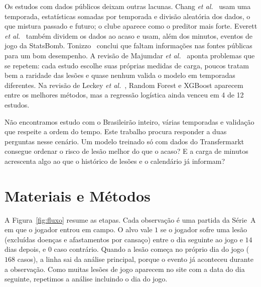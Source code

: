 \documentclass[conference]{IEEEtran}
\begin{document}
Os estudos com dados públicos deixam outras lacunas. Chang \textit{et al.}~\cite{chang2024} usam uma temporada, estatísticas somadas por temporada e divisão aleatória dos dados, o que mistura passado e futuro; o clube aparece como o preditor mais forte. Everett \textit{et al.}~\cite{everett2024} também dividem os dados ao acaso e usam, além dos minutos, eventos de jogo da StatsBomb. Tonizzo~\cite{tonizzo2025} conclui que faltam informações nas fontes públicas para um bom desempenho. A revisão de Majumdar \textit{et al.}~\cite{majumdar2022} aponta problemas que se repetem: cada estudo escolhe suas próprias medidas de carga, poucos tratam bem a raridade das lesões e quase nenhum valida o modelo em temporadas diferentes. Na revisão de Leckey \textit{et al.}~\cite{leckey2025}, Random Forest e XGBoost aparecem entre os melhores métodos, mas a regressão logística ainda venceu em 4 de 12 estudos.

Não encontramos estudo com o Brasileirão inteiro, várias temporadas e validação que respeite a ordem do tempo. Este trabalho procura responder a duas perguntas nesse cenário. Um modelo treinado só com dados do Transfermarkt consegue ordenar o risco de lesão melhor do que o acaso? E a carga de minutos acrescenta algo ao que o histórico de lesões e o calendário já informam?

\section{Materiais e Métodos}

A Figura~\ref{fig:fluxo} resume as etapas. Cada observação é uma partida da Série~A em que o jogador entrou em campo. O alvo vale $1$ se o jogador sofre uma lesão (excluídas doenças e afastamentos por cansaço) entre o dia seguinte ao jogo e $14$ dias depois, e $0$ caso contrário. Quando a lesão começa no próprio dia do jogo ($168$ casos), a linha sai da análise principal, porque o evento já aconteceu durante a observação. Como muitas lesões de jogo aparecem no site com a data do dia seguinte, repetimos a análise incluindo o dia do jogo.
\end{document}
